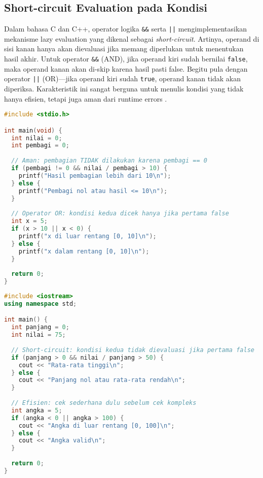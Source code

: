 \documentclass[../main.tex]{subfiles}
\begin{document}
\subsection{Short-circuit Evaluation pada Kondisi}
Dalam bahasa C dan C++, operator logika \texttt{\&\&} serta \texttt{||} mengimplementasikan mekanisme lazy evaluation yang dikenal sebagai \emph{short-circuit}. Artinya, operand di sisi kanan hanya akan dievaluasi jika memang diperlukan untuk menentukan hasil akhir. Untuk operator \texttt{\&\&} (AND), jika operand kiri sudah bernilai \texttt{false}, maka operand kanan akan di-skip karena hasil pasti false. Begitu pula dengan operator \texttt{||} (OR)—jika operand kiri sudah \texttt{true}, operand kanan tidak akan diperiksa. Karakteristik ini sangat berguna untuk menulis kondisi yang tidak hanya efisien, tetapi juga aman dari runtime errors \parencite{gnu-c-manual,cpp-reference}.

\begin{lstlisting}[language=C, caption={Short-circuit di C untuk keamanan}]
#include <stdio.h>

int main(void) {
  int nilai = 0;
  int pembagi = 0;
  
  // Aman: pembagian TIDAK dilakukan karena pembagi == 0
  if (pembagi != 0 && nilai / pembagi > 10) {
    printf("Hasil pembagian lebih dari 10\n");
  } else {
    printf("Pembagi nol atau hasil <= 10\n");
  }
  
  // Operator OR: kondisi kedua dicek hanya jika pertama false
  int x = 5;
  if (x > 10 || x < 0) {
    printf("x di luar rentang [0, 10]\n");
  } else {
    printf("x dalam rentang [0, 10]\n");
  }
  
  return 0;
}
\end{lstlisting}

\begin{lstlisting}[language=C++, caption={Short-circuit di C++ untuk efisiensi}]
#include <iostream>
using namespace std;

int main() {
  int panjang = 0;
  int nilai = 75;
  
  // Short-circuit: kondisi kedua tidak dievaluasi jika pertama false
  if (panjang > 0 && nilai / panjang > 50) {
    cout << "Rata-rata tinggi\n";
  } else {
    cout << "Panjang nol atau rata-rata rendah\n";
  }
  
  // Efisien: cek sederhana dulu sebelum cek kompleks
  int angka = 5;
  if (angka < 0 || angka > 100) {
    cout << "Angka di luar rentang [0, 100]\n";
  } else {
    cout << "Angka valid\n";
  }
  
  return 0;
}
\end{lstlisting}
\end{document}
